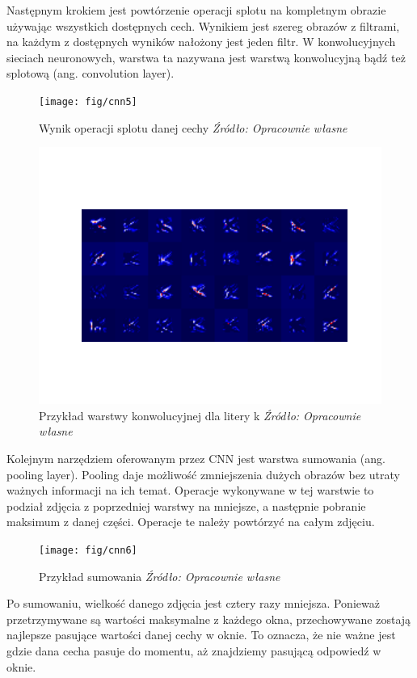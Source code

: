 \documentclass[brudnopis]{xmgr}
\begin{document}
Następnym krokiem jest powtórzenie operacji splotu na kompletnym obrazie używając wszystkich dostępnych cech. Wynikiem jest szereg obrazów z filtrami, na każdym z dostępnych wyników nałożony jest jeden filtr. W konwolucyjnych sieciach neuronowych, warstwa ta nazywana jest warstwą konwolucyjną bądź też splotową (ang. convolution layer).

\begin{figure}[!tbh]
\centering
\texttt{[image: fig/cnn5]}
\caption{Wynik operacji splotu danej cechy \emph{Źródło: Opracownie własne}}
\end{figure}
\newpage


\begin{figure}[!tbh]
\centering
\includegraphics[width=.7\hsize]{fig/figure_1}
\caption{Przykład warstwy konwolucyjnej dla litery k \emph{Źródło: Opracownie własne}}
\end{figure}

Kolejnym narzędziem oferowanym przez CNN jest warstwa sumowania (ang. pooling layer). Pooling daje możliwość zmniejszenia dużych obrazów bez utraty ważnych informacji na ich temat. Operacje wykonywane w tej warstwie to podział zdjęcia z poprzedniej warstwy na mniejsze, a następnie pobranie maksimum z danej części. Operacje te należy powtórzyć na całym zdjęciu.

\begin{figure}[!tbh]
\centering
\texttt{[image: fig/cnn6]}
\caption{Przykład sumowania \emph{Źródło: Opracownie własne}}
\end{figure}
\newpage

Po sumowaniu, wielkość danego zdjęcia jest cztery razy mniejsza. Ponieważ przetrzymywane są wartości maksymalne z każdego okna, przechowywane zostają najlepsze pasujące wartości danej cechy w oknie. To oznacza, że nie ważne jest gdzie dana cecha pasuje do momentu, aż znajdziemy pasującą odpowiedź w oknie.
\end{document}
